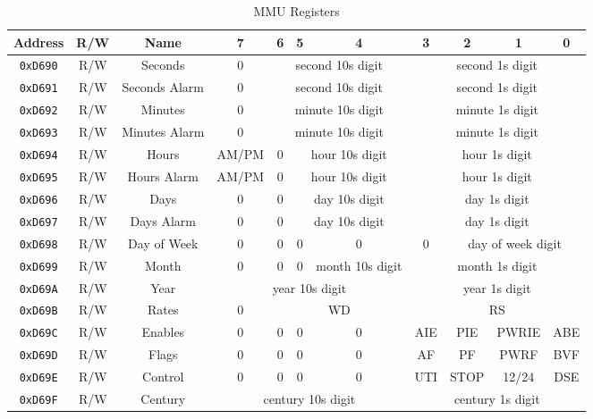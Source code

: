 \begin{table}[h]
	\begin{center}
		\begin{tabular}{| c | c | c || c | c | c | c | c | c | c | c |} \hline
			Address & R/W & Name & 7 & 6 & 5 & 4 & 3 & 2 & 1 & 0 \\ \hline\hline
			\verb+0xD690+ & R/W & Seconds & 0 & \multicolumn{3}{|c|}{second 10s digit} & \multicolumn{4}{|c|}{second 1s digit} \\ \hline
            \verb+0xD691+ & R/W & Seconds Alarm & 0 & \multicolumn{3}{|c|}{second 10s digit} & \multicolumn{4}{|c|}{second 1s digit} \\ \hline
            \verb+0xD692+ & R/W & Minutes & 0 & \multicolumn{3}{|c|}{minute 10s digit} & \multicolumn{4}{|c|}{minute 1s digit} \\ \hline
            \verb+0xD693+ & R/W & Minutes Alarm & 0 & \multicolumn{3}{|c|}{minute 10s digit} & \multicolumn{4}{|c|}{minute 1s digit} \\ \hline
            \verb+0xD694+ & R/W & Hours & AM/PM & 0 & \multicolumn{2}{|c|}{hour 10s digit} & \multicolumn{4}{|c|}{hour 1s digit} \\ \hline
            \verb+0xD695+ & R/W & Hours Alarm & AM/PM & 0 & \multicolumn{2}{|c|}{hour 10s digit} & \multicolumn{4}{|c|}{hour 1s digit} \\ \hline
            \verb+0xD696+ & R/W & Days & 0 & 0 & \multicolumn{2}{|c|}{day 10s digit} & \multicolumn{4}{|c|}{day 1s digit} \\ \hline
            \verb+0xD697+ & R/W & Days Alarm & 0 & 0 & \multicolumn{2}{|c|}{day 10s digit} & \multicolumn{4}{|c|}{day 1s digit} \\ \hline
            \verb+0xD698+ & R/W & Day of Week & 0 & 0 & 0 & 0 & 0 & \multicolumn{3}{|c|}{day of week digit} \\ \hline
            \verb+0xD699+ & R/W & Month & 0 & 0 & 0 & month 10s digit & \multicolumn{4}{|c|}{month 1s digit} \\ \hline
            \verb+0xD69A+ & R/W & Year & \multicolumn{4}{|c|}{year 10s digit} & \multicolumn{4}{|c|}{year 1s digit}  \\ \hline
            \verb+0xD69B+ & R/W & Rates & 0 & \multicolumn{3}{|c|}{WD} & \multicolumn{4}{|c|}{RS} \\ \hline
            \verb+0xD69C+ & R/W & Enables & 0 & 0 & 0 & 0 & AIE & PIE & PWRIE & ABE \\ \hline
            \verb+0xD69D+ & R/W & Flags & 0 & 0 & 0 & 0 & AF & PF & PWRF & BVF \\ \hline
            \verb+0xD69E+ & R/W & Control & 0 & 0 & 0 & 0 & UTI & STOP & 12/24 & DSE \\ \hline
            \verb+0xD69F+ & R/W & Century & \multicolumn{4}{|c|}{century 10s digit} & \multicolumn{4}{|c|}{century 1s digit}  \\ \hline
		\end{tabular}
	\end{center}
	\caption{MMU Registers}
	\label{tab:rtc_registers}
\end{table}

